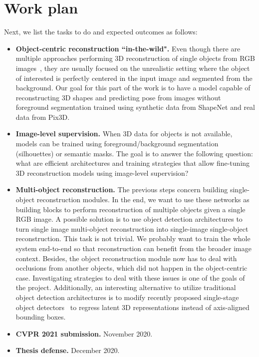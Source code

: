 \section{Work plan}
Next, we list the tasks to do and expected outcomes as follows:
\begin{itemize}
    \item \textbf{Object-centric reconstruction ``in-the-wild".} Even though
    there are multiple approaches performing 3D reconstruction of single objects
    from RGB images~\cite{mrt18,atlasnet,psg,choy20163d}, they are usually focused
    on the unrealistic setting where the object of interested is perfectly centered in the input image and segmented from the background.
    Our goal for this part of the work is to have a model capable of reconstructing 3D shapes and predicting pose from images without foreground segmentation trained using synthetic data from ShapeNet and
    real data from Pix3D.
    
    \item \textbf{Image-level supervision.} When 3D data for objects is not available, models can be trained using foreground/background segmentation (silhouettes) or semantic masks. The goal is to answer the following question: what are efficient architectures and
    training strategies that allow fine-tuning 3D reconstruction models
    using image-level supervision?
    
    \item \textbf{Multi-object reconstruction.} The previous steps concern
    building single-object reconstruction modules. In the end, we want to use
    these networks as building blocks to perform reconstruction of multiple
    objects given a single RGB image. A possible solution is to use
    object detection architectures to turn single image multi-object reconstruction into single-image single-object reconstruction.
    This task is not trivial.
    We probably want to train the whole system end-to-end so that reconstruction can benefit
    from the broader image context.
    Besides, the object reconstruction module now has to deal with occlusions from another objects,
    which did not happen in the object-centric case.
    Investigating strategies to deal with these issues is one of the goals of the project.
    Additionally, an interesting alternative to utilize traditional object detection architectures is to modify recently proposed single-stage
    object detectors~\cite{objaspts,cornernet} to regress latent 3D representations instead of
    axis-aligned bounding boxes.

    \item \textbf{CVPR 2021 submission.} November 2020.
    
    \item \textbf{Thesis defense.} December 2020.
\end{itemize}

